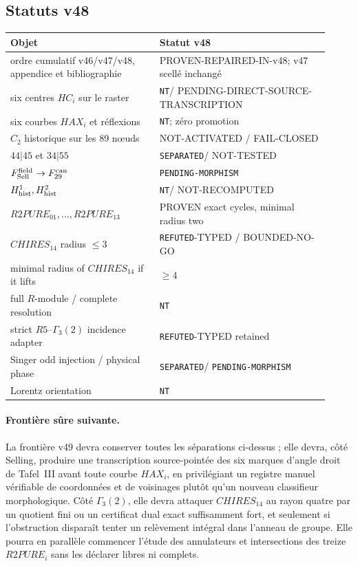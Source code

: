 \documentclass[11pt,a4paper]{article}
\newcommand{\certRefuted}{\texttt{REFUTED}}
\newcommand{\certSeparated}{\texttt{SEPARATED}}
\newcommand{\certPending}{\texttt{PENDING-MORPHISM}}
\newcommand{\certNT}{\texttt{NT}}
\begin{document}
\subsection{Statuts v48}

\begin{center}
\begin{tabular}{p{0.43\linewidth}p{0.49\linewidth}}
\toprule
Objet & Statut v48 \\
\midrule
ordre cumulatif v46/v47/v48, appendice et bibliographie & PROVEN-REPAIRED-IN-v48; v47 scellé inchangé \\
six centres $HC_i$ sur le raster & \certNT / PENDING-DIRECT-SOURCE-TRANSCRIPTION \\
six courbes $HAX_i$ et réflexions & \certNT; zéro promotion \\
$C_2$ historique sur les 89 nœuds & NOT-ACTIVATED / FAIL-CLOSED \\
$44|45$ et $34|55$ & \certSeparated / NOT-TESTED \\
$F_{\rm Sell}^{\rm field}\to F_{29}^{\rm can}$ & \certPending \\
$H^1_{\rm hist},H^2_{\rm hist}$ & \certNT / NOT-RECOMPUTED \\
$R2PURE_{01},\ldots,R2PURE_{13}$ & PROVEN exact cycles, minimal radius two \\
$CHIRES_{14}$ radius $\le3$ & \certRefuted{}-TYPED / BOUNDED-NO-GO \\
minimal radius of $CHIRES_{14}$ if it lifts & $\ge4$ \\
full $R$-module / complete resolution & \certNT \\
strict $R5$--$\Gamma_3(2)$ incidence adapter & \certRefuted{}-TYPED retained \\
Singer odd injection / physical phase & \certSeparated / \certPending \\
Lorentz orientation & \certNT \\
\bottomrule
\end{tabular}
\end{center}

\paragraph{Frontière sûre suivante.}
La frontière v49 devra conserver toutes les séparations ci-dessus ; elle devra, côté Selling, produire une transcription source-pointée des six marques d'angle droit de Tafel~III avant toute courbe $HAX_i$, en privilégiant un registre manuel vérifiable de coordonnées et de voisinages plutôt qu'un nouveau classifieur morphologique. Côté $\Gamma_3(2)$, elle devra attaquer $CHIRES_{14}$ au rayon quatre par un quotient fini ou un certificat dual exact suffisamment fort, et seulement si l'obstruction disparaît tenter un relèvement intégral dans l'anneau de groupe. Elle pourra en parallèle commencer l'étude des annulateurs et intersections des treize $R2PURE_i$ sans les déclarer libres ni complets.
\end{document}

